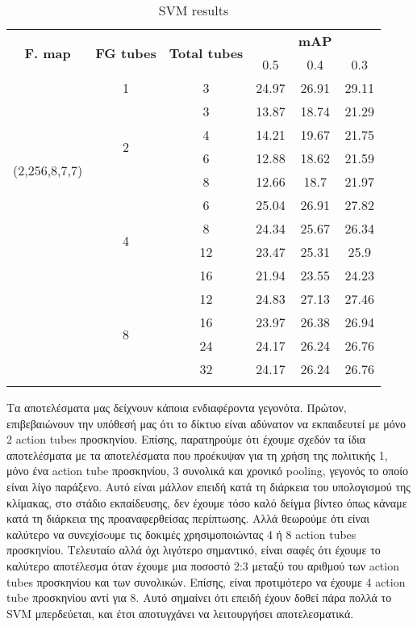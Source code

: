 \begin{center}
  \en
  \setlength{\tabcolsep}{2pt}
  \begin{longtable}{|| c | c | c || c c c||}


    \hline
    \multirow{2}{*}{\textbf{F. map}} & \multirow{2}{*}{\textbf{FG tubes}} & \multirow{2}{*}{\textbf{Total tubes}} & {} & \textbf{mAP} & {} \\
    {}  & {} & {} & 0.5 & 0.4 & 0.3 \\
    \hline
    \multirow{8}{*}{(2,256,8,7,7)} & 1 & 3 & 24.97 & 26.91 & 29.11\\
    \cline{2-6}
    {} & \multirow{4}{*}{2} & 3 & 13.87 & 18.74 & 21.29 \\
    \cline{3-6}
    {} & {} & 4 & 14.21 & 19.67 & 21.75 \\
    \cline{3-6}
    {} & {} & 6 & 12.88 & 18.62 & 21.59 \\
    \cline{3-6}
    {} & {} & 8 & 12.66 & 18.7 & 21.97 \\
    \cline{2-6}
    {} & \multirow{4}{*}{4} & 6 & 25.04 & 26.91 & 27.82  \\
    \cline{3-6}
    {} & {} &  8 & 24.34 & 25.67 & 26.34 \\
    \cline{3-6}
    {} & {} & 12 &  23.47 & 25.31 & 25.9 \\
    \cline{3-6}
    {} & {} & 16 & 21.94 & 23.55 & 24.23 \\
    \cline{2-6}
    {} & \multirow{4}{*}{8} & 12 & 24.83 & 27.13 & 27.46 \\
    \cline{3-6}
    {} & {} & 16 & 23.97 & 26.38 & 26.94 \\
    \cline{3-6}
    {} & {} & 24 & 24.17 & 26.24 & 26.76 \\
    \cline{3-6}
    {} & {} & 32 & 24.17 & 26.24 & 26.76 \\

    \hline

    \caption{SVM results }
    \label{table:gr_svm_increased}
  \end{longtable}
\end{center}

Τα αποτελέσματα μας δείχνουν κάποια ενδιαφέροντα γεγονότα. Πρώτον, επιβεβαιώνουν την υπόθεσή μας
ότι το δίκτυο είναι αδύνατον να εκπαιδευτεί με μόνο 2 \en action tubes \gr προσκηνίου.
Επίσης, παρατηρούμε ότι έχουμε σχεδόν τα ίδια αποτελέσματα με
τα αποτελέσματα που προέκυψαν για τη χρήση της πολιτικής 1, μόνο ένα \en action tube \gr προσκηνίου, 3 συνολικά και
χρονικό \en pooling, \gr γεγονός το οποίο είναι λίγο παράξενο. Αυτό είναι μάλλον επειδή κατά τη διάρκεια του υπολογισμού της κλίμακας,
στο στάδιο εκπαίδευσης, δεν έχουμε τόσο
καλό δείγμα βίντεο όπως κάναμε κατά τη διάρκεια της προαναφερθείσας περίπτωσης. Αλλά θεωρούμε ότι είναι καλύτερο να συνεχίσoυμε
τις δοκιμές χρησιμοποιώντας 4 ή 8 \en action tubes \gr προσκηνίου. Τελευταίο
αλλά όχι λιγότερο σημαντικό, είναι σαφές ότι έχουμε το καλύτερο αποτέλεσμα όταν έχουμε μια ποσοστό 2:3
μεταξύ του αριθμού των \en action tubes \gr προσκηνίου και των συνολικών. Επίσης, είναι προτιμότερο
να έχουμε 4 \en action tube \gr προσκηνίου αντί για 8. Αυτό σημαίνει ότι επειδή έχουν δοθεί πάρα πολλά
το \en SVM  \gr μπερδεύεται, και έτσι αποτυγχάνει να λειτουργήσει αποτελεσματικά.

